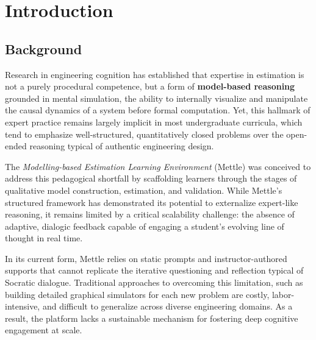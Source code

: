 \section{Introduction}
\label{sec:introduction}

\subsection{Background}
\label{subsection:Background}
Research in engineering cognition has established that expertise in estimation is not a purely procedural competence, but a form of \textbf{model-based reasoning} grounded in mental simulation, the ability to internally visualize and manipulate the causal dynamics of a system before formal computation. Yet, this hallmark of expert practice remains largely implicit in most undergraduate curricula, which tend to emphasize well-structured, quantitatively closed problems over the open-ended reasoning typical of authentic engineering design.

The \textit{Modelling-based Estimation Learning Environment} (Mettle) was conceived to address this pedagogical shortfall by scaffolding learners through the stages of qualitative model construction, estimation, and validation. While Mettle’s structured framework has demonstrated its potential to externalize expert-like reasoning, it remains limited by a critical scalability challenge: the absence of adaptive, dialogic feedback capable of engaging a student’s evolving line of thought in real time.

In its current form, Mettle relies on static prompts and instructor-authored supports that cannot replicate the iterative questioning and reflection typical of Socratic dialogue. Traditional approaches to overcoming this limitation, such as building detailed graphical simulators for each new problem are costly, labor-intensive, and difficult to generalize across diverse engineering domains. As a result, the platform lacks a sustainable mechanism for fostering deep cognitive engagement at scale.

